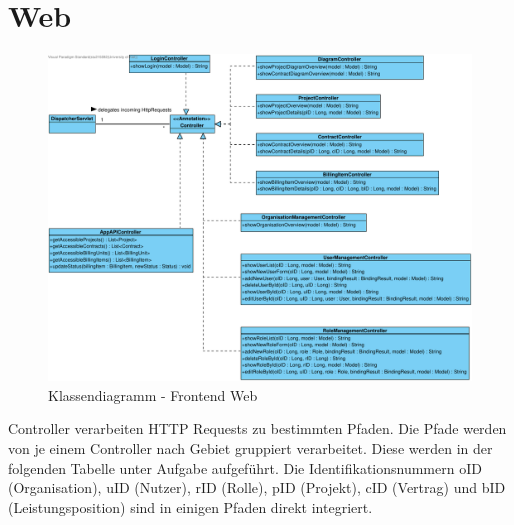 \clearpage

\section{Web}

\begin{figure}[h]
	\centering
	\includegraphics[width=\linewidth]{img/diagrams/Frontend Classes.pdf}
	\caption{Klassendiagramm - Frontend Web}
	\label{fig:klassendiagramm-web}
\end{figure}

\noindent
Controller verarbeiten HTTP Requests zu bestimmten Pfaden.
Die Pfade werden von je einem Controller nach Gebiet gruppiert verarbeitet.
Diese werden in der folgenden Tabelle unter Aufgabe aufgeführt.
Die Identifikationsnummern oID (Organisation), uID (Nutzer), rID (Rolle), pID (Projekt), cID (Vertrag) und bID (Leistungsposition) sind in einigen Pfaden direkt integriert.\\

